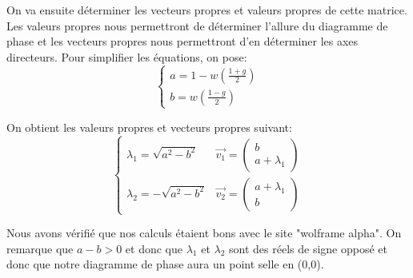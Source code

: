 \documentclass[12pt]{article}
\begin{document}
On va ensuite déterminer les vecteurs propres et valeurs propres de cette matrice. Les valeurs propres nous permettront de déterminer l'allure du diagramme de phase et les vecteurs propres nous permettront d'en déterminer les axes directeurs. Pour simplifier les équations, on pose:
\begin{equation}
    \begin{cases}
        a=1-w\left(\frac{1+g}{2}\right) \\
        b=w\left(\frac{1-g}{2}\right)
    \end{cases}
    \label{eq:abreviation}
\end{equation}\par
On obtient les valeurs propres et vecteurs propres suivant:
\begin{equation}
    \begin{cases}
        \lambda_1=\sqrt{a^2-b^2} & \overrightarrow{v_1}=
        \begin{pmatrix}
            b\\
            a+\lambda_1
        \end{pmatrix}\\
        \lambda_2=-\sqrt{a^2-b^2} & \overrightarrow{v_2}=
        \begin{pmatrix}
            a+\lambda_1\\
            b
        \end{pmatrix}
    \end{cases}
\end{equation}  \par
Nous avons vérifié que nos calculs étaient bons avec le site "wolframe alpha". On remarque que $a-b>0$ et donc que $\lambda_1$ et $\lambda_2$ sont des réels de signe opposé et donc que notre diagramme de phase aura un point selle en (0,0). 
\end{document}
